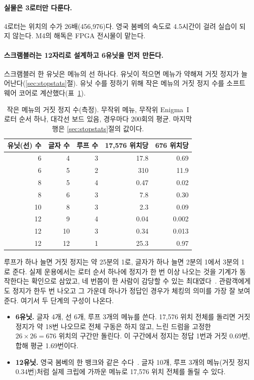 \paragraph{실물은 3로터만 다룬다.} 4로터는 위치의 수가 26배(456,976)다. 영국 봄베의 속도로 4.5시간이 걸려
실습이 되지 않는다. M4의 해독은 FPGA 전시물이 맡는다.

\paragraph{스크램블러는 12자리로 설계하고 6유닛을 먼저 만든다.} 스크램블러 한 유닛은 메뉴의 선 하나다.
유닛이 적으면 메뉴가 약해져 거짓 정지가 늘어난다(\ref{sec:stopstats}절). 유닛 수를 정하기 위해 작은 메뉴의
거짓 정지 수를 소프트웨어 코어로 계산했다(표~\ref{tab:hw-units}).

\begin{table}[ht]
\centering
\caption{작은 메뉴의 거짓 정지 수(측정). 무작위 메뉴, 무작위 Enigma~I 로터 순서 하나, 대각선 보드 있음,
경우마다 200회의 평균. 마지막 행은 \ref{sec:stopstats}절의 값이다.}
\label{tab:hw-units}
\small
\begin{tabular}{rrrrr}
\toprule
유닛(선) 수 & 글자 수 & 루프 수 & 17,576 위치당 & 676 위치당 \\
\midrule
6 & 4 & 3 & 17.8 & 0.69 \\
6 & 5 & 2 & 310 & 11.9 \\
8 & 5 & 4 & 0.47 & 0.02 \\
8 & 6 & 3 & 7.8 & 0.30 \\
10 & 8 & 3 & 2.3 & 0.09 \\
12 & 9 & 4 & 0.04 & 0.002 \\
12 & 10 & 3 & 0.34 & 0.013 \\
12 & 12 & 1 & 25.3 & 0.97 \\
\bottomrule
\end{tabular}
\end{table}

루프가 하나 늘면 거짓 정지는 약 25분의 1로, 글자가 하나 늘면 2분의 1에서 3분의 1로 준다. 실제 운용에서는
로터 순서 하나에 정지가 한 번 이상 나오는 것을 기계가 동작한다는 확인으로 삼았고, 네 번쯤이 한 사람이 감당할
수 있는 최대였다~\cite{us6812report1944}. 관람객에게도 정지가 한두 번 나오고 그 가운데 하나가 정답인 경우가
체킹의 의미를 가장 잘 보여 준다. 여기서 두 단계의 구성이 나온다.

\begin{itemize}
\item \textbf{6유닛.} 글자 4개, 선 6개, 루프 3개의 메뉴를 쓴다. 17,576 위치 전체를 돌리면 거짓 정지가
약 18번 나오므로 전체 구동은 하지 않고, 느린 드럼을 고정한 $26\times26 = 676$ 위치의 구간만 돌린다.
이 구간에서 정지는 정답 1번과 거짓 0.69번, 합해 평균 1.69번이다.
\item \textbf{12유닛.} 영국 봄베의 한 뱅크와 같은 수다~\cite{us6812report1944}. 글자 10개, 루프 3개의
메뉴(거짓 정지 0.34번)처럼 실제 크립에 가까운 메뉴로 17,576 위치 전체를 돌릴 수 있다.
\end{itemize}

